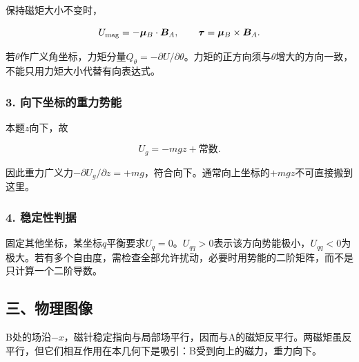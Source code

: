 \documentclass[12pt,a4paper,fontset=fandol]{ctexart}
\begin{document}
保持磁矩大小不变时，

\[
U_{\rm mag}=-\boldsymbol\mu_B\cdot\boldsymbol B_A,
\qquad
\boldsymbol\tau=\boldsymbol\mu_B\times\boldsymbol B_A.
\]

若\(\theta\)作广义角坐标，力矩分量\(Q_\theta=-\partial U/\partial\theta\)。力矩的正方向须与\(\theta\)增大的方向一致，不能只用力矩大小代替有向表达式。

\subsubsection{3.
向下坐标的重力势能}\label{ux5411ux4e0bux5750ux6807ux7684ux91cdux529bux52bfux80fd}

本题\(z\)向下，故

\[
U_g=-mgz+\text{常数}.
\]

因此重力广义力\(-\partial U_g/\partial z=+mg\)，符合向下。通常向上坐标的\(+mgz\)不可直接搬到这里。

\subsubsection{4. 稳定性判据}\label{ux7a33ux5b9aux6027ux5224ux636e}

固定其他坐标，某坐标\(q\)平衡要求\(U_q=0\)。\(U_{qq}>0\)表示该方向势能极小，\(U_{qq}<0\)为极大。若有多个自由度，需检查全部允许扰动，必要时用势能的二阶矩阵，而不是只计算一个二阶导数。

\subsection{三、物理图像}\label{ux4e09ux7269ux7406ux56feux50cf-3}

B处的场沿\(-x\)，磁针稳定指向与局部场平行，因而与A的磁矩反平行。两磁矩虽反平行，但它们相互作用在本几何下是吸引：B受到向上的磁力，重力向下。

\begin{center}
\begin{minipage}{\linewidth}
\centering\begingroup{}
\ifdim\wd\diagrambox>.88\linewidth
\sbox{\diagrambox}{\resizebox{.88\linewidth}{!}{\usebox{\diagrambox}}}\fi
\ifdim\ht\diagrambox>.38\textheight
\resizebox{!}{.38\textheight}{\usebox{\diagrambox}}
\else\usebox{\diagrambox}\fi
\par{}\endgroup\end{minipage}\end{center}
\end{document}
